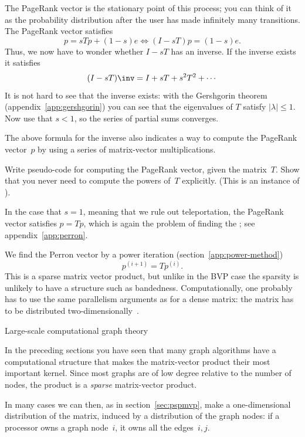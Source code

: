 The PageRank vector is the stationary point of this process; you can
think of it as the probability distribution after the user has made
infinitely many transitions. The PageRank vector satisfies
\[ p=sTp+(1-s)e \Leftrightarrow (I-sT)p=(1-s)e. \]
Thus, we now have to wonder whether $I-sT$ has an inverse.
If the inverse exists it satisfies
\[ (I-sT)\inv = I+sT+s^2T^2+\cdots \]
It is not hard to see that the inverse exists: with the Gershgorin theorem
(appendix~\ref{app:gershgorin}) you can see that the eigenvalues of
$T$ satisfy $|\lambda|\leq 1$. Now use that $s<1$, so the series of
partial sums converges.

The above formula for the inverse also indicates a way to compute the
PageRank vector~$p$ by using a series of matrix-vector
multiplications.

\begin{exercise}
  Write pseudo-code for computing the PageRank vector, given the
  matrix~$T$. Show that you never need to compute the powers of~$T$
  explicitly. (This is an instance of ).
\end{exercise}

In the case that $s=1$, meaning that we rule out teleportation, the
PageRank vector satisfies $p=Tp$, which is again the problem of
finding the ; see appendix~\ref{app:perron}.

We find the Perron vector by a power iteration (section~\ref{app:power-method})
\[ p^{(i+1)} = T p^{(i)}. \]
This is a sparse matrix vector product, but unlike in the \ac{BVP}
case the sparsity is unlikely to have a structure such as
bandedness. Computationally, one probably has to use the same
parallelism arguments as for a dense matrix: the matrix has to be
distributed two-dimensionally~\cite{OgAi:sparsestorage}.


 {Large-scale computational graph theory}
\label{sec:random-graph-product}

In the preceding sections you have seen that many graph algorithms
have a computational structure that makes the matrix-vector product
their most important kernel. Since most graphs are of low degree 
relative to the number of nodes, the product is a \emph{sparse}
matrix-vector product.

In many cases we can then, as in section~\ref{sec:pspmvp},
make a one-dimensional distribution of the matrix,
induced by a distribution of the graph nodes: if a processor
owns a graph node~$i$, it owns all the edges~$i,j$.

